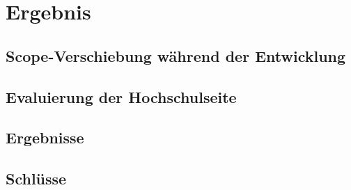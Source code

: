 


	
\chapter{Ergebnis}
	\section{Scope-Verschiebung während der Entwicklung}
	\section{Evaluierung der Hochschulseite}
	\section{Ergebnisse}
	\section{Schlüsse}
